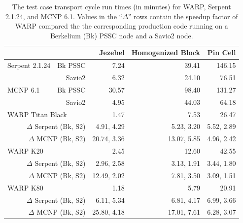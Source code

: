 \documentclass[preprint,12pt]{elsarticle}
\begin{document}
\begin{table}[h]
\centering
\caption{The test case transport cycle run times (in minutes) for WARP, Serpent 2.1.24, and MCNP 6.1.  Values in the ``$\Delta$'' rows contain the speedup factor of WARP compared the the corresponding production code running on a Berkelium (Bk) PSSC node and a Savio2 node.}
\label{results_table_times}
\scriptsize
\begin{tabular}{| l r | r | r | r |}
\cline{3-5}
\multicolumn{2}{c|}{}                            & Jezebel     & Homogenized Block & Pin Cell     \\
\hline                          
Serpent 2.1.24   &    Bk PSSC                    & 7.24        & 39.41             & 146.15       \\
                 &    Savio2                     & 6.32        & 24.10             & 76.51        \\
\hline                                        
MCNP 6.1         &    Bk PSSC                    &  30.57      & 98.40             & 131.27       \\
                 &    Savio2                     &   4.95      & 44.03             & 64.18        \\
\hline                          
\multicolumn{2}{|l|}{WARP Titan Black}           &  1.47       & 7.53              &  26.47       \\
\multicolumn{2}{|r|}{$\Delta$ Serpent (Bk, S2)}  & 4.91,  4.29  & 5.23,  3.20        &  5.52,  2.89  \\
\multicolumn{2}{|r|}{$\Delta$ MCNP    (Bk, S2)}  & 20.74, 3.36  & 13.07, 5.85        &  4.96,  2.42  \\
\hline
\multicolumn{2}{|l|}{WARP K20}                   & 2.45         & 12.60            & 42.55        \\
\multicolumn{2}{|r|}{$\Delta$ Serpent (Bk, S2)}  & 2.96,  2.58   & 3.13,  1.91       & 3.44,  1.80   \\
\multicolumn{2}{|r|}{$\Delta$ MCNP    (Bk, S2)}  & 12.49, 2.02   & 7.81,  3.50       & 3.09,  1.51   \\
\hline
\multicolumn{2}{|l|}{WARP K80}                   & 1.18         & 5.79             & 20.91        \\
\multicolumn{2}{|r|}{$\Delta$ Serpent (Bk, S2)}  & 6.11,  5.34   & 6.81,  4.17       & 6.99,  3.66   \\
\multicolumn{2}{|r|}{$\Delta$ MCNP    (Bk, S2)}  & 25.80, 4.18   & 17.01, 7.61       & 6.28,  3.07   \\
\hline
\end{tabular}


\end{table}
\end{document}
